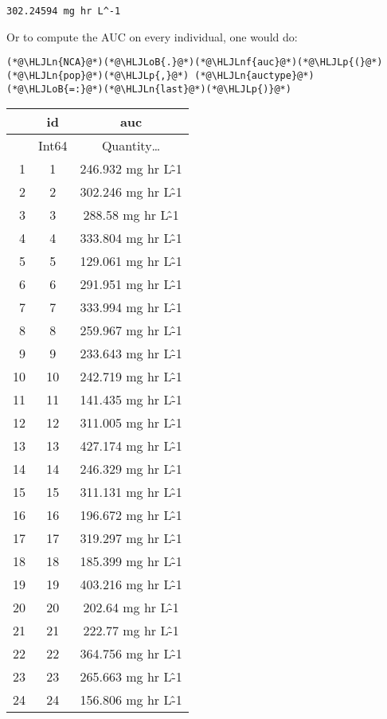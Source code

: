 \documentclass[12pt,a4paper]{article}
\newcommand{\HLJLn}[1]{#1}
\newcommand{\HLJLnf}[1]{\textcolor[RGB]{66,102,213}{#1}}
\newcommand{\HLJLoB}[1]{\textcolor[RGB]{102,102,102}{\textbf{#1}}}
\newcommand{\HLJLp}[1]{#1}
\begin{document}
\begin{lstlisting}
302.24594 mg hr L^-1
\end{lstlisting}


Or to compute the AUC on every individual, one would do:


\begin{lstlisting}
(*@\HLJLn{NCA}@*)(*@\HLJLoB{.}@*)(*@\HLJLnf{auc}@*)(*@\HLJLp{(}@*)(*@\HLJLn{pop}@*)(*@\HLJLp{,}@*) (*@\HLJLn{auctype}@*)(*@\HLJLoB{=:}@*)(*@\HLJLn{last}@*)(*@\HLJLp{)}@*)
\end{lstlisting}


\begin{tabular}{r|cc}
	& id & auc\\
	\hline
	& Int64 & Quantity…\\
	\hline
	1 & 1 & 246.932 mg hr L\^-1 \\
	2 & 2 & 302.246 mg hr L\^-1 \\
	3 & 3 & 288.58 mg hr L\^-1 \\
	4 & 4 & 333.804 mg hr L\^-1 \\
	5 & 5 & 129.061 mg hr L\^-1 \\
	6 & 6 & 291.951 mg hr L\^-1 \\
	7 & 7 & 333.994 mg hr L\^-1 \\
	8 & 8 & 259.967 mg hr L\^-1 \\
	9 & 9 & 233.643 mg hr L\^-1 \\
	10 & 10 & 242.719 mg hr L\^-1 \\
	11 & 11 & 141.435 mg hr L\^-1 \\
	12 & 12 & 311.005 mg hr L\^-1 \\
	13 & 13 & 427.174 mg hr L\^-1 \\
	14 & 14 & 246.329 mg hr L\^-1 \\
	15 & 15 & 311.131 mg hr L\^-1 \\
	16 & 16 & 196.672 mg hr L\^-1 \\
	17 & 17 & 319.297 mg hr L\^-1 \\
	18 & 18 & 185.399 mg hr L\^-1 \\
	19 & 19 & 403.216 mg hr L\^-1 \\
	20 & 20 & 202.64 mg hr L\^-1 \\
	21 & 21 & 222.77 mg hr L\^-1 \\
	22 & 22 & 364.756 mg hr L\^-1 \\
	23 & 23 & 265.663 mg hr L\^-1 \\
	24 & 24 & 156.806 mg hr L\^-1 \\
\end{tabular}
\end{document}
